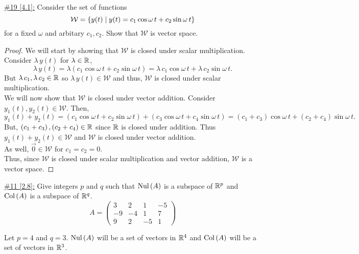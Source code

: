 \documentclass{exam}
\begin{document}
\underline{\#19 [4.1]:} Consider the set of functions 
\[
    \mathcal{W} = \left\{y(t) \mid y(t) = c_1\cos\omega\,t + c_2\sin\omega\,t \right\}
\]
for a fixed $\omega$ and arbitary $c_1, c_2$. Show that $\mathcal{W}$ is vector space.
\begin{solution}
    \begin{proof}
        We will start by showing that $\mathcal{W}$ is closed under scalar multiplication. Consider $\lambda\,y(t)$ for $\lambda \in \mathbb R$, 
        \[
            \lambda\,y(t) = \lambda\left(c_1\cos\omega\,t + c_2\sin\omega\,t\right) = \lambda\,c_1\cos\omega\,t + \lambda\,c_2\sin\omega\,t.
        \]
        But $\lambda\,c_1, \lambda\,c_2 \in \mathbb R$ so $\lambda\,y(t) \in \mathcal{W}$ and thus, $\mathcal{W}$ is closed under scalar multiplication. \\
        We will now show that $\mathcal{W}$ is closed under vector addition. Consider $y_1(t), y_2(t) \in \mathcal{W}$. Then, 
        \[
            y_1(t) + y_2(t) = \left(c_1\cos\omega\,t + c_2\sin\omega\,t\right) + \left(c_3\cos\omega\,t + c_4\sin\omega\,t\right) = \left(c_1 + c_3\right)\cos\omega\,t + \left(c_2 + c_4\right)\sin\omega\,t.
        \]
        But, $\left(c_1 + c_3\right), \left(c_2 + c_4\right) \in \mathbb R$ since $\mathbb R$ is closed under addition. Thus $y_1(t) + y_2(t) \in \mathcal{W}$ and $\mathcal{W}$ is closed under vector addition. \\ As well, $\vec{0} \in \mathcal{W}$ for $c_1 = c_2 = 0$. \\ Thus, since $\mathcal{W}$ is closed under scalar multiplication and vector addition, $\mathcal{W}$ is a vector space.
    \end{proof}
\end{solution}

\underline{\#11 [2.8]:} Give integers $p$ and $q$ such that $\text{Nul}\left(A\right)$ is a subspace of $\mathbb R^{p}$ and $\text{Col}\left(A\right)$ is a subspace of $\mathbb R^{q}$.
\[
    A = \begin{pmatrix}
        3 & 2 & 1 & -5 \\
        -9 & -4 & 1 & 7 \\
        9 & 2 & -5 & 1
    \end{pmatrix}
\]
\begin{solution}
    Let $p=4$ and $q=3$. $\text{Nul}\left(A\right)$ will be a set of vectors in $\mathbb R^{4}$ and $\text{Col}\left(A\right)$ will be a set of vectors in $\mathbb R^{3}$.  
\end{solution}
\end{document}
